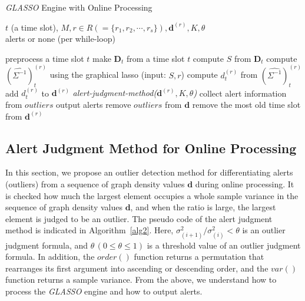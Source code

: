 \documentclass[conference]{IEEEtran}
\begin{document}

\begin{algorithm}[tb]
\caption{{\it GLASSO} Engine with Online Processing}
\label{alg1}
\begin{algorithmic}[1]
  \REQUIRE $t$ (a time slot), $M, r \in R ( = \{r_1, r_2, \cdots, r_s\} ), \bm{d}^{(r)}, K, \theta$\\
  \ENSURE alerts or none (per while-loop)

    \STATE preprocess a time slot $t$
    \STATE make $\bm{D}_t$ from a time slot $t$
    \STATE compute $S$ from $\bm{D}_t$
      \STATE compute ${(\hat{\Sigma^{-1}})}_t^{(r)}$ using the graphical lasso (input: $S,r$)
      \STATE compute $d_t^{(r)}$ from ${(\hat{\Sigma^{-1}})}_t^{(r)}$
      \STATE add $d_t^{(r)}$ to $\bm{d}^{(r)}$
         {\it alert-judgment-method($\bm{d}^{(r)}, K, \theta$)}
          \STATE collect alert information from $outliers$
          \STATE output alerts
          \STATE remove $outliers$ from $\bm{d}$
        \ELSE
          \STATE remove the most old time slot from $\bm{d}^{(r)}$
        \ENDIF
  		\ENDIF
  	\ENDFOR
  \ENDWHILE
\end{algorithmic}
\end{algorithm}





\subsection{Alert Judgment Method for Online Processing}
In this section, we propose an outlier detection method for differentiating alerts (outliers) from a sequence of graph density values $\bm{d}$ during online processing.
It is checked how much the largest element occupies a whole sample variance in the sequence of graph density values $\bm{d}$, and when the ratio is large, the largest element is judged to be an outlier.
The pseudo code of the alert judgment method is indicated in Algorithm~\ref{alg2}.
Here, $\sigma^{2}_{(i+1)}/\sigma^{2}_{(i)}<\theta$ is an outlier judgment formula, and $\theta \, (0\leq \theta \leq 1)$ is a threshold value of an outlier judgment formula.
In addition, the $order()$ function returns a permutation that rearranges its first argument into ascending or descending order, and the $var()$ function returns a sample variance.
From the above, we understand how to process the {\it GLASSO} engine and how to output alerts.
\end{document}
